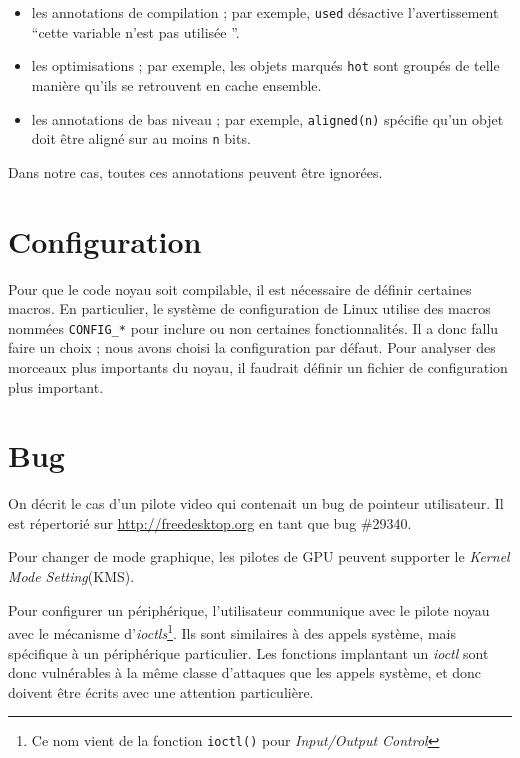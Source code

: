 \begin{itemize}
  \item les annotations de compilation ; par exemple, \texttt{used} désactive
    l'avertissement ``cette variable n'est pas utilisée ''.

  \item les optimisations ; par exemple, les objets marqués \texttt{hot} sont
    groupés de telle manière qu'ils se retrouvent en cache ensemble.

  \item les annotations de bas niveau ; par exemple, \texttt{aligned(n)}
    spécifie qu'un objet doit être aligné sur au moins \texttt{n} bits.
\end{itemize}

Dans notre cas, toutes ces annotations peuvent être ignorées.

\section{Configuration}

Pour que le code noyau soit compilable, il est nécessaire de définir certaines
macros. En particulier, le système de configuration de Linux utilise des macros
nommées \texttt{CONFIG\_*} pour inclure ou non certaines fonctionnalités. Il a
donc fallu faire un choix ; nous avons choisi la configuration par défaut. Pour
analyser des morceaux plus importants du noyau, il faudrait définir un fichier
de configuration plus important.

\section{Bug}

On décrit le cas d'un pilote video qui contenait un bug de pointeur utilisateur.
Il est répertorié sur \url{http://freedesktop.org} en tant que bug \#29340. 

Pour changer de mode graphique, les pilotes de GPU peuvent supporter le
\emph{Kernel Mode Setting}(KMS).

Pour configurer un périphérique, l'utilisateur communique avec le pilote noyau
avec le mécanisme d'\emph{ioctls}\footnote{
  Ce nom vient de la fonction \texttt{ioctl()} pour
  \emph{Input/Output Control}
}.
Ils sont similaires à des appels système, mais spécifique à un périphérique
particulier. Les fonctions implantant un \emph{ioctl} sont donc vulnérables à la
même classe d'attaques que les appels système, et donc doivent être écrits avec
une attention particulière.

